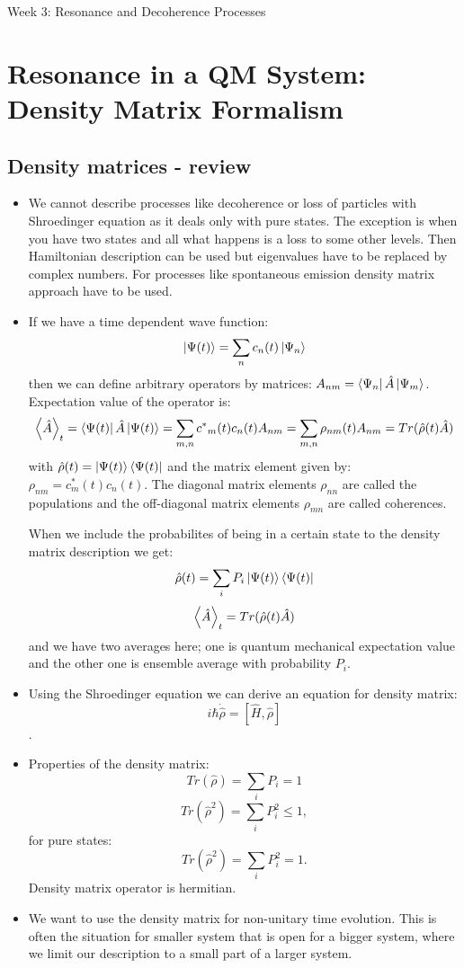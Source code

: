 \documentclass[AtomicOptical1Notes.tex]{subfiles}
\begin{document}
\begin{center}\huge Week 3: Resonance and Decoherence Processes\end{center}

\section{Resonance in a QM System: Density Matrix Formalism}
	
	\subsection{Density matrices - review}
		\begin{itemize}
			\item We cannot describe processes like decoherence or loss of particles with Shroedinger equation as it deals only with pure states. The exception is when you have two states and all what happens is a loss to some other levels. Then Hamiltonian description can be used but eigenvalues have to be replaced by complex numbers. For processes like spontaneous emission density matrix approach have to be used.
			\item If we have a time dependent wave function: $$ \left| \Psi(t) \right>= \sum_{n} c_n(t) \left| \Psi_n \right> $$ then we can define arbitrary operators by matrices: $ A_{nm}=\left< \Psi_n \right|\hat{A}\left| \Psi_m \right> $. Expectation value of the operator is: $$ \left< \hat{A} \right>_t=\left< \Psi(t) \right|\hat{A}\left| \Psi(t) \right>= \sum_{m,n} {c^*}_m(t)c_n(t) A_{nm} = \sum_{m,n} \rho_{nm}(t)A_{nm} = Tr(\hat{\rho}(t)\hat{A}) $$ with $ \hat{\rho}(t)=\left| \Psi(t) \right>\left< \Psi(t) \right| $ and the matrix element given by: $ \rho_{nm}=c_m^*(t)c_n(t) $. The diagonal matrix elements $ \rho_{nn} $ are called the populations and the off-diagonal matrix elements $ \rho_{mn} $ are called coherences.
			
			When we include the probabilites of being in a certain state to the density matrix description we get: $$ \hat{\rho}(t)=\sum_{i}P_i\left| \Psi(t) \right>\left< \Psi(t) \right| $$ $$ \left< \hat{A} \right>_t = Tr(\hat{\rho}(t)\hat{A}) $$ and we have two averages here; one is quantum mechanical expectation value and the other one is ensemble average with probability $ P_i $.
			\item Using the Shroedinger equation we can derive an equation for density matrix: $$ i\hbar\dot{\hat{\rho}} = [\hat{H},\hat{\rho}] $$.
			\item Properties of the density matrix: $$ Tr(\hat{\rho})=\sum_{i} P_i = 1 $$ $$ Tr(\hat{\rho}^2)=\sum_{i} P_i^2 \leq 1, $$ for pure states: $$ Tr(\hat{\rho}^2)=\sum_{i} P_i^2 = 1. $$ Density matrix operator is hermitian.
			\item We want to use the density matrix for non-unitary time evolution. This is often the situation for smaller system that is open for a bigger system, where we limit our description to a small part of a larger system.
		\end{itemize}
		
\end{document}
